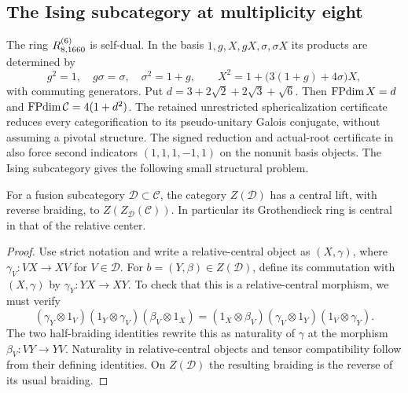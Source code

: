 \subsection{The Ising subcategory at multiplicity eight}
\label{subsec:frontier-1660}
The ring $R^{(6)}_{8,1660}$ is self-dual. In the basis
$1,g,X,gX,\sigma,\sigma X$ its products are determined by
\[
 g^2=1,\quad g\sigma=\sigma,\quad\sigma^2=1+g,\qquad
 X^2=1+\bigl(3(1+g)+4\sigma\bigr)X,
\]
with commuting generators. Put $d=3+2\sqrt2+2\sqrt3+\sqrt6$.
Then $\operatorname{FPdim} X=d$ and $\operatorname{FPdim}\mathcal C=4(1+d^2)$.
The retained unrestricted sphericalization certificate reduces every
categorification to its pseudo-unitary Galois conjugate, without
assuming a pivotal structure. The signed reduction and actual-root
certificate in  also force
second indicators $(1,1,1,-1,1)$ on the nonunit basis objects.
The Ising subcategory gives the following small structural problem.

\begin{lemma}
For a fusion subcategory $\mathcal D\subset\mathcal C$, the category
$Z(\mathcal D)$ has a central lift, with reverse braiding, to
$Z(Z_{\mathcal D}(\mathcal C))$. In particular its Grothendieck ring
is central in that of the relative center.
\end{lemma}
\begin{proof}
Use strict notation and write a relative-central object as $(X,\gamma)$,
where $\gamma_V:VX\to XV$ for $V\in\mathcal D$. For
$b=(Y,\beta)\in Z(\mathcal D)$, define its commutation with $(X,\gamma)$
by $\gamma_Y:YX\to XY$. To check that this is a relative-central morphism,
we must verify
\[
 (\gamma_Y\otimes1_V)(1_Y\otimes\gamma_V)(\beta_V\otimes1_X)
 =(1_X\otimes\beta_V)(\gamma_V\otimes1_Y)(1_V\otimes\gamma_Y).
\]
The two half-braiding identities rewrite this as naturality of $\gamma$
at the morphism $\beta_V:VY\to YV$. Naturality in relative-central objects
and tensor compatibility follow from their defining identities. On
$Z(\mathcal D)$ the resulting braiding is the reverse of its usual braiding.
\end{proof}

